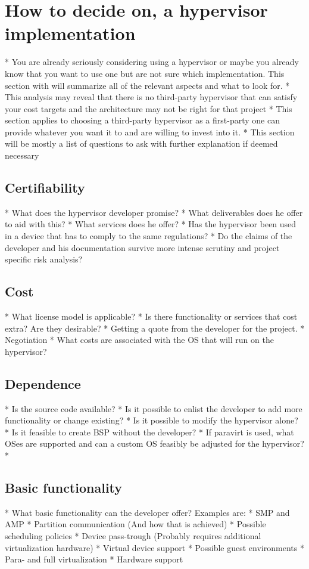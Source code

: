 
\section{How to decide on, a hypervisor implementation}
* You are already seriously considering using a hypervisor or maybe you already know that you want to use one but are not sure which implementation. This section with will summarize all of the relevant aspects and what to look for. 
* This analysis may reveal that there is no third-party hypervisor that can satisfy your cost targets and the architecture may not be right for that project
* This section applies to choosing a third-party hypervisor as a first-party one can provide whatever you want it to and are willing to invest into it.
* This section will be mostly a list of questions to ask with further explanation if deemed necessary    
\subsection{Certifiability}
* What does the hypervisor developer promise?
* What deliverables does he offer to aid with this?
* What services does he offer?
* Has the hypervisor been used in a device that has to comply to the same regulations?
* Do the claims of the developer and his documentation survive more intense scrutiny and project specific risk analysis?
\subsection{Cost}
* What license model is applicable?
* Is there functionality or services that cost extra? Are they desirable?
* Getting a quote from the developer for the project.
* Negotiation
* What costs are associated with the OS that will run on the hypervisor?
\subsection{Dependence}
* Is the source code available?
* Is it possible to enlist the developer to add more functionality or change existing?
* Is it possible to modify the hypervisor alone?
* Is it feasible to create BSP without the developer?
* If paravirt is used, what OSes are supported and can a custom OS feasibly be adjusted for the hypervisor?
* 
\subsection{Basic functionality}
* What basic functionality can the developer offer?
Examples are:
	* SMP and AMP
    * Partition communication (And how that is achieved)
    * Possible scheduling policies
    * Device pass-trough (Probably requires additional virtualization hardware)
    * Virtual device support
    * Possible guest environments
    * Para- and full virtualization
    * Hardware support
    
